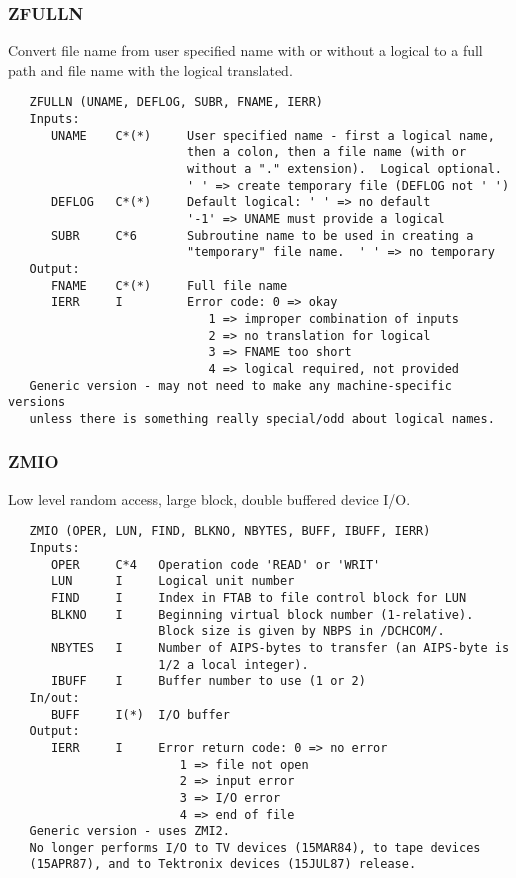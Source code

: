 \subsubsection{ZFULLN}
Convert file name from user specified name with or without a logical
to a full path and file name with the logical translated.
\begin{verbatim}
   ZFULLN (UNAME, DEFLOG, SUBR, FNAME, IERR)
   Inputs:
      UNAME    C*(*)     User specified name - first a logical name,
                         then a colon, then a file name (with or
                         without a "." extension).  Logical optional.
                         ' ' => create temporary file (DEFLOG not ' ')
      DEFLOG   C*(*)     Default logical: ' ' => no default
                         '-1' => UNAME must provide a logical
      SUBR     C*6       Subroutine name to be used in creating a
                         "temporary" file name.  ' ' => no temporary
   Output:
      FNAME    C*(*)     Full file name
      IERR     I         Error code: 0 => okay
                            1 => improper combination of inputs
                            2 => no translation for logical
                            3 => FNAME too short
                            4 => logical required, not provided
   Generic version - may not need to make any machine-specific versions
   unless there is something really special/odd about logical names.
\end{verbatim}

\subsubsection{ZMIO}
Low level random access, large block, double buffered device I/O.
\begin{verbatim}
   ZMIO (OPER, LUN, FIND, BLKNO, NBYTES, BUFF, IBUFF, IERR)
   Inputs:
      OPER     C*4   Operation code 'READ' or 'WRIT'
      LUN      I     Logical unit number
      FIND     I     Index in FTAB to file control block for LUN
      BLKNO    I     Beginning virtual block number (1-relative).
                     Block size is given by NBPS in /DCHCOM/.
      NBYTES   I     Number of AIPS-bytes to transfer (an AIPS-byte is
                     1/2 a local integer).
      IBUFF    I     Buffer number to use (1 or 2)
   In/out:
      BUFF     I(*)  I/O buffer
   Output:
      IERR     I     Error return code: 0 => no error
                        1 => file not open
                        2 => input error
                        3 => I/O error
                        4 => end of file
   Generic version - uses ZMI2.
   No longer performs I/O to TV devices (15MAR84), to tape devices
   (15APR87), and to Tektronix devices (15JUL87) release.
\end{verbatim}

